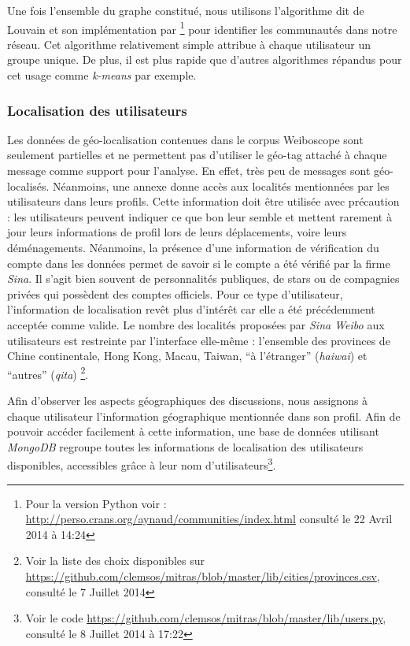     Une fois l{\textquoteright}ensemble du graphe constitué, nous utilisons l{\textquoteright}algorithme dit de Louvain et son implémentation par \cite{Blondel2008}\footnote{Pour la version Python voir : \url{http://perso.crans.org/aynaud/communities/index.html} consulté le 22 Avril 2014 à 14:24} pour identifier les communautés dans notre réseau. Cet algorithme relativement simple attribue à chaque utilisateur un groupe unique. De plus, il est plus rapide que d'autres algorithmes répandus pour cet usage comme \textit{k-means} par exemple.

\subsubsection[Localisation des utilisateurs]{Localisation des utilisateurs}
\label{sec:geoloc}
    Les données de géo-localisation contenues dans le corpus Weiboscope sont seulement partielles et ne permettent pas d'utiliser le géo-tag attaché à chaque message comme support pour l'analyse. En effet, très peu de messages sont géo-localisés. Néanmoins, une annexe donne accès aux localités mentionnées par les utilisateurs dans leurs profils. Cette information doit être utilisée avec précaution : les utilisateurs peuvent indiquer ce que bon leur semble et mettent rarement à jour leurs informations de profil lors de leurs déplacements, voire leurs déménagements. Néanmoins, la présence d'une information de vérification du compte dans les données permet de savoir si le compte a été vérifié par la firme \textit{Sina}. Il s'agit bien souvent de personnalités publiques, de stars ou de compagnies privées qui possèdent des comptes officiels. Pour ce type d'utilisateur, l'information de localisation revêt plus d'intérêt car elle a été  précédemment acceptée comme valide. Le nombre des localités proposées par \textit{Sina Weibo} aux utilisateurs est restreinte par l{\textquoteright}interface  elle-même : l{\textquoteright}ensemble des provinces de Chine continentale, Hong Kong, Macau, Taiwan, {\textquotedblleft}à l{\textquoteright}étranger{\textquotedblright} (\textit{haiwai}) et {\textquotedblleft}autres{\textquotedblright} (\textit{qita}) \footnote{Voir la liste des choix disponibles sur \url{https://github.com/clemsos/mitras/blob/master/lib/cities/provinces.csv}, consulté le 7 Juillet 2014}.

    Afin d'observer les aspects géographiques des discussions, nous assignons à chaque utilisateur l{\textquoteright}information géographique mentionnée dans son profil. Afin de pouvoir accéder facilement à cette information, une base de données utilisant \textit{MongoDB} regroupe toutes les informations de localisation des utilisateurs disponibles, accessibles grâce à leur nom d'utilisateurs\footnote{Voir le code \url{https://github.com/clemsos/mitras/blob/master/lib/users.py}, consulté le 8 Juillet 2014 à 17:22}.



